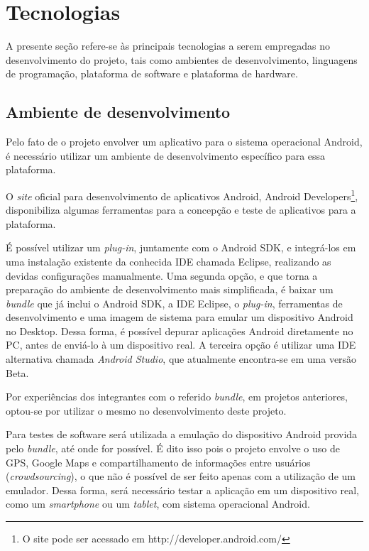 
\section{Tecnologias}\label{s:tecnologias}

A presente seção refere-se às principais tecnologias a serem empregadas no desenvolvimento do projeto, tais como ambientes de desenvolvimento, linguagens de programação, plataforma de software e plataforma de hardware.

\subsection{Ambiente de desenvolvimento}

Pelo fato de o projeto envolver um aplicativo para o sistema operacional Android, é necessário utilizar um ambiente de desenvolvimento específico para essa plataforma.

O \emph{site} oficial para desenvolvimento de aplicativos Android, Android Developers\footnote{O site pode ser acessado em http://developer.android.com/}, disponibiliza algumas ferramentas para a concepção e teste de aplicativos para a plataforma.

É possível utilizar um \emph{plug-in}, juntamente com o Android SDK, e integrá-los em uma instalação existente da conhecida IDE chamada Eclipse, realizando as devidas configurações manualmente. Uma segunda opção, e que torna a preparação do ambiente de desenvolvimento mais simplificada, é baixar um \emph{bundle} que já inclui o Android SDK, a IDE Eclipse, o \emph{plug-in}, ferramentas de desenvolvimento e uma imagem de sistema para emular um dispositivo Android no Desktop. Dessa forma, é possível depurar aplicações Android diretamente no PC, antes de enviá-lo à um dispositivo real. A terceira opção é utilizar uma IDE alternativa chamada \emph{Android Studio}, que atualmente encontra-se em uma versão Beta.

Por experiências dos integrantes com o referido \emph{bundle}, em projetos anteriores, optou-se por utilizar o mesmo no desenvolvimento deste projeto.

Para testes de software será utilizada a emulação do dispositivo Android provida pelo \emph{bundle}, até onde for possível. É dito isso pois o projeto envolve o uso de GPS, Google Maps e compartilhamento de informações entre usuários (\emph{crowdsourcing}), o que não é possível de ser feito apenas com a utilização de um emulador. Dessa forma, será necessário testar a aplicação em um dispositivo real, como um \emph{smartphone} ou um \emph{tablet}, com sistema operacional Android.

